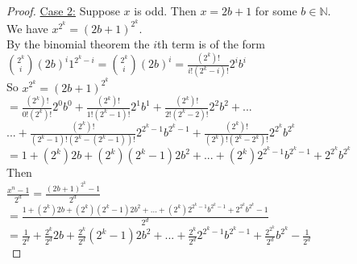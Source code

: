 \documentclass{article}
\begin{document}
\begin{flushleft}
\begin{proof}
        \vspace{.1in}

        \underline{Case 2:} Suppose $x$ is odd. Then $x=2b+1$ for some $b\in{\mathbb{N}}$.\\\vspace{.05in}
        We have $x^{2^k}=(2b+1)^{2^k}$. \\\vspace{.05in}
        By the binomial theorem the $i$th term is of the form\\\vspace{.05in}
        \hspace{.2in} $\displaystyle{2^k \choose i}(2b)^i1^{2^k-i}={2^k \choose i}(2b)^i=\frac{(2^k)!}{i!(2^k-i)!}2^ib^i$\\\vspace{.05in}
        So $x^{2^k}=(2b+1)^{2^k}$ \\\vspace{.05in}
        \hspace{.39in} $\displaystyle=\frac{(2^k)!}{0!(2^k)!}2^0b^0+\frac{(2^k)!}{1!(2^k-1)!}2^1b^1+\frac{(2^k)!}{2!(2^k-2)!}2^2b^2+...$\\
        \hspace{.55in} $\displaystyle...+\frac{(2^k)!}{(2^k-1)!(2^k-(2^k-1))!}2^{2^k-1}b^{2^k-1}+\frac{(2^k)!}{(2^k)!(2^k-2^k)!}2^{2^k}b^{2^k}$\\\vspace{.05in}
        \hspace{.39in} $\displaystyle=1+(2^k)2b+(2^k)(2^k-1)2b^2+...+(2^k)2^{2^k-1}b^{2^k-1}+2^{2^k}b^{2^k}$\\\vspace{.05in}
        Then\\\vspace{.05in}
        \hspace{.2in} $\displaystyle\frac{x^n-1}{2^d}=\frac{(2b+1)^{2^k}-1}{2^d}$\\\vspace{.05in}
        \hspace{.665in} $\displaystyle =\frac{1+(2^k)2b+(2^k)(2^k-1)2b^2+...+(2^k)2^{2^k-1}b^{2^k-1}+2^{2^k}b^{2^k}-1}{2^d}$\\\vspace{.05in}
        \hspace{.665in} $\displaystyle=\frac{1}{2^d}+\frac{2^k}{2^d}2b+\frac{2^k}{2^d}(2^k-1)2b^2+...+\frac{2^k}{2^d}2^{2^k-1}b^{2^k-1}+\frac{2^{2^k}}{2^d}b^{2^k}-\frac{1}{2^d}$\\\vspace{.05in}

\end{proof}
\end{flushleft}
\end{document}
